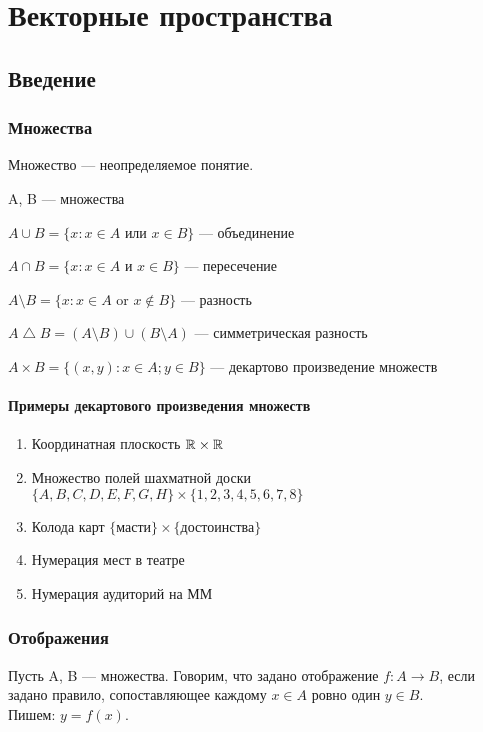 \documentclass[main]{subfiles}
\begin{document}
\part{Векторные пространства}
\chapter{Введение}
\section{Множества}
\begin{definition}
    Множество --- неопределяемое понятие.
\end{definition}

A, B --- множества

$A \cup B = \{x:x \in A \text{ или } x \in B\}$ --- объединение

$A \cap B = \{x:x \in A \text{ и } x \in B\}$ --- пересечение

$A\setminus B = \{x:x \in A \text{ or } x \not\in B\}$ --- разность

$A \bigtriangleup B = (A \setminus B) \cup (B \setminus A)$ --- симметрическая разность

$A \times B = \{(x,y):x \in A; y \in B\}$ --- декартово произведение множеств

\subsection{Примеры декартового произведения множеств}

\begin{enumerate}
    \item Координатная плоскость $\mathbb{R} \times \mathbb{R}$
    \item Множество полей шахматной доски $\{A,B,C,D,E,F,G,H\}\times \{1,2,3,4,5,6,7,8\}$
    \item Колода карт $\{\text{масти}\} \times \{\text{достоинства}\}$
    \item Нумерация мест в театре
    \item Нумерация аудиторий на ММ
\end{enumerate}

\section{Отображения}
\begin{definition}
    Пусть A, B --- множества.
    Говорим, что задано отображение $f: A \to B$,
    если задано правило, сопоставляющее каждому $x \in A$ ровно один $y \in B$.\\
    Пишем: $y = f(x)$.
\end{definition}
\end{document}
